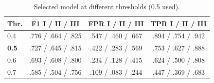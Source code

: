 \begin{table}[t]
\centering
\footnotesize
\setlength{\tabcolsep}{3pt}
\begin{tabular}{@{}lccc@{}}
\toprule
Thr. & F1 I / II / III & FPR I / II / III & TPR I / II / III \\
\midrule
0.4 & .776 / .664 / .825 & .547 / .460 / .667 & .894 / .754 / .942 \\
\textbf{0.5} & .727 / .645 / .815 & .422 / .283 / .569 & .753 / .627 / .888 \\
0.6 & .693 / .608 / .800 & .234 / .128 / .415 & .624 / .500 / .808 \\
0.7 & .585 / .504 / .756 & .109 / .083 / .244 & .447 / .369 / .683 \\
\bottomrule
\end{tabular}
\caption{Selected model at different thresholds (0.5 used).}
\label{tab:thr}
\end{table}
